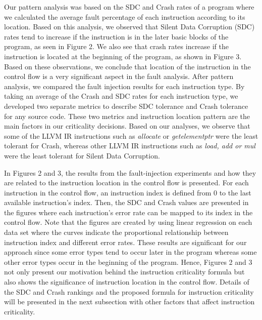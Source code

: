 Our pattern analysis was based on the SDC and Crash rates of a program where we calculated the average fault percentage of each instruction according to its location. Based on this analysis, we observed that Silent Data Corruption (SDC) rates tend to increase if the instruction is in the later basic blocks of the program, as seen in Figure 2. We also see that crash rates increase if the instruction is located at the beginning of the program, as shown in Figure 3. Based on these observations, we conclude that location of the instruction in the control flow is a very significant aspect in the fault analysis. After pattern analysis, we compared the fault injection results for each instruction type. By taking an average of the Crash and SDC rates for each instruction type, we developed two separate metrics to describe SDC tolerance and Crash tolerance for any source code. These two metrics and instruction location pattern are the main factors in our criticality decisions. Based on our analyses, we observe that some of the LLVM IR instructions such as {\em allocate} or {\em getelementptr} were the least tolerant for Crash, whereas other LLVM IR instructions such as {\em load, add or mul} were the least tolerant for Silent Data Corruption. 

In Figures 2 and 3, the results from the fault-injection experiments and how they are related to the instruction location in the control flow is presented. For each instruction in the control flow, an instruction index is defined from 0 to the last available instruction's index. Then, the SDC and Crash values are presented in the figures where each instruction's error rate can be mapped to its index in the control flow. Note that the figures are created by using linear regression on each data set where the curves indicate the proportional relationship between instruction index and different error rates. These results are significant for our approach since some error types tend to occur later in the program whereas some other error types occur in the beginning of the program. Hence, Figures 2 and 3 not only present our motivation behind the instruction criticality formula but also shows the significance of instruction location in the control flow. Details of the SDC and Crash rankings and the proposed formula for instruction criticality will be presented in the next subsection with other factors that affect instruction criticality. 

